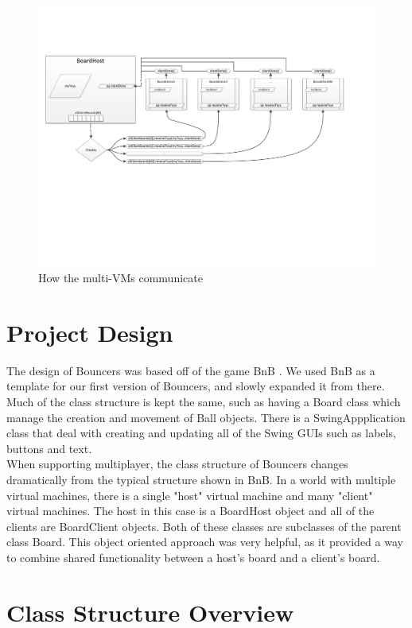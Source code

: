 \documentclass[11pt]{article}
\begin{document}
\begin{figure}
	\begin{center}
		\includegraphics[viewport = 17 242 720 515, width=\textwidth]{fig2b.pdf}
	\end{center}
	\caption{How the multi-VMs communicate}
	\label{fig2b}
\end{figure}

\section{Project Design}
The design of Bouncers was based off of the game BnB \cite{JRBook}.  We used
BnB as a template for our first version of Bouncers, and slowly expanded it
from there.  Much of the class structure is kept the same, such as having a
Board class which manage the creation and movement of Ball objects.  There
is a SwingAppplication class that deal with creating and updating all of the 
Swing GUIs such as labels, buttons and text.
\\
When supporting multiplayer, the class structure of Bouncers changes 
dramatically from the typical structure shown in BnB.  In a world with 
multiple virtual machines, there is a single "host" virtual machine and many
"client" virtual machines.  The host in this case is a BoardHost object and
all of the clients are BoardClient objects.  Both of these classes are 
subclasses of the parent class Board.  This object oriented approach was
very helpful, as it provided a way to combine shared functionality between
a host's board and a client's board.


\section{Class Structure Overview}
\end{document}
